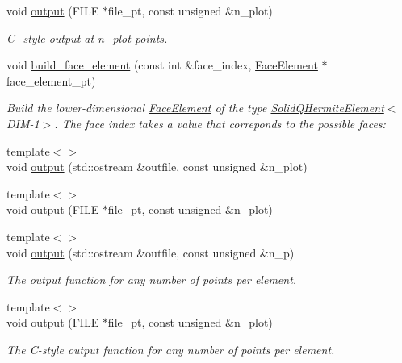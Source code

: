 \begin{DoxyCompactItemize}
void \hyperlink{classoomph_1_1SolidQHermiteElement_a29b211e63df67028435a71ac732d47ad}{output} (F\+I\+LE $\ast$file\+\_\+pt, const unsigned \&n\+\_\+plot)
\begin{DoxyCompactList}\small\item\em C\+\_\+style output at n\+\_\+plot points. \end{DoxyCompactList}\item 
void \hyperlink{classoomph_1_1SolidQHermiteElement_a4e81780865998f59277d7424217ec7c1}{build\+\_\+face\+\_\+element} (const int \&face\+\_\+index, \hyperlink{classoomph_1_1FaceElement}{Face\+Element} $\ast$face\+\_\+element\+\_\+pt)
\begin{DoxyCompactList}\small\item\em Build the lower-\/dimensional \hyperlink{classoomph_1_1FaceElement}{Face\+Element} of the type \hyperlink{classoomph_1_1SolidQHermiteElement}{Solid\+Q\+Hermite\+Element}$<$D\+I\+M-\/1$>$. The face index takes a value that correponds to the possible faces\+: \end{DoxyCompactList}\item 
{\footnotesize template$<$$>$ }\\void \hyperlink{classoomph_1_1SolidQHermiteElement_adef773329622efbbe113755da62a9cae}{output} (std\+::ostream \&outfile, const unsigned \&n\+\_\+plot)
\item 
{\footnotesize template$<$$>$ }\\void \hyperlink{classoomph_1_1SolidQHermiteElement_adb8a603a0f50a7944be7af4a1cd0abc5}{output} (F\+I\+LE $\ast$file\+\_\+pt, const unsigned \&n\+\_\+plot)
\item 
{\footnotesize template$<$$>$ }\\void \hyperlink{classoomph_1_1SolidQHermiteElement_ade1e06d5bf37699c512cd91c013dd1e9}{output} (std\+::ostream \&outfile, const unsigned \&n\+\_\+p)
\begin{DoxyCompactList}\small\item\em The output function for any number of points per element. \end{DoxyCompactList}\item 
{\footnotesize template$<$$>$ }\\void \hyperlink{classoomph_1_1SolidQHermiteElement_aabd23592071d29249154d7cde20f2d88}{output} (F\+I\+LE $\ast$file\+\_\+pt, const unsigned \&n\+\_\+plot)
\begin{DoxyCompactList}\small\item\em The C-\/style output function for any number of points per element. \end{DoxyCompactList}\end{DoxyCompactItemize}
